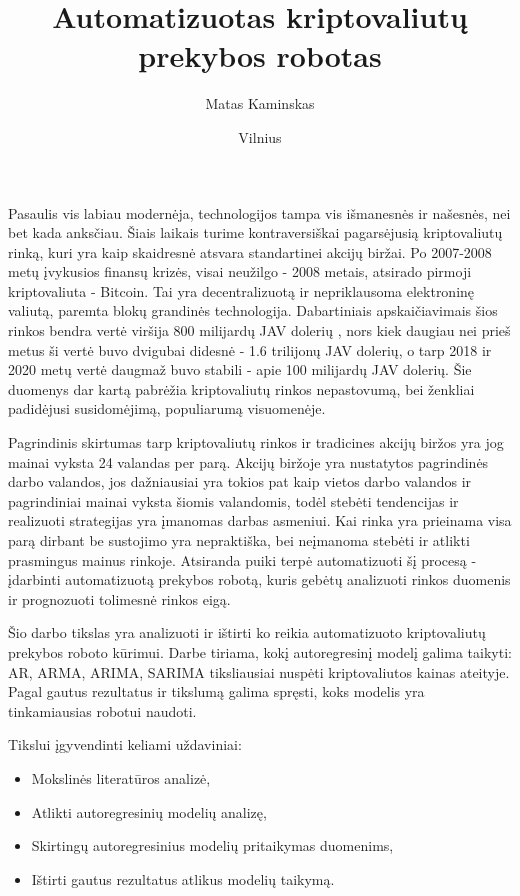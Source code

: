 \documentclass{VUMIFInfKursinis}
\institute{Informatikos institutas}  %
\title{Automatizuotas kriptovaliutų prekybos robotas}
\author{Matas Kaminskas}
\date{Vilnius \\ \the\year}
\begin{document}
\maketitle

\tableofcontents

Pasaulis vis labiau modernėja, technologijos tampa vis išmanesnės ir našesnės, nei bet kada anksčiau. Šiais laikais turime kontraversiškai pagarsėjusią
kriptovaliutų rinką, kuri yra kaip skaidresnė atsvara standartinei akcijų biržai. Po 2007-2008 metų įvykusios finansų krizės,
visai neužilgo - \cite{nakamoto2008bitcoin} 2008 metais, atsirado pirmoji kriptovaliuta - Bitcoin. Tai yra decentralizuotą ir nepriklausoma elektroninę valiutą, paremta
blokų grandinės technologija. Dabartiniais apskaičiavimais šios rinkos bendra vertė viršija 800 milijardų JAV dolerių \cite{CoinMarketCap},
nors kiek daugiau nei prieš metus ši vertė buvo dvigubai didesnė - 1.6 trilijonų JAV dolerių, o tarp 2018 ir 2020 metų vertė daugmaž buvo stabili - apie 100 milijardų JAV dolerių.
Šie duomenys dar kartą pabrėžia kriptovaliutų rinkos nepastovumą, bei ženkliai padidėjusi susidomėjimą, populiarumą visuomenėje.    


Pagrindinis skirtumas tarp kriptovaliutų rinkos ir tradicines akcijų biržos yra jog mainai vyksta 24 valandas per parą. Akcijų biržoje yra nustatytos pagrindinės darbo valandos,
jos dažniausiai yra tokios pat kaip vietos darbo valandos ir pagrindiniai mainai vyksta šiomis valandomis, todėl stebėti tendencijas ir realizuoti strategijas yra įmanomas darbas asmeniui.
Kai rinka yra prieinama visa parą dirbant be sustojimo yra nepraktiška, bei neįmanoma stebėti ir atlikti prasmingus mainus rinkoje. Atsiranda puiki terpė automatizuoti šį 
procesą - įdarbinti automatizuotą prekybos robotą, kuris gebėtų analizuoti rinkos duomenis ir prognozuoti tolimesnė rinkos eigą.


Šio darbo tikslas yra analizuoti ir ištirti ko reikia automatizuoto kriptovaliutų prekybos roboto kūrimui. 
Darbe tiriama, kokį autoregresinį modelį galima taikyti: AR, ARMA, ARIMA, SARIMA tiksliausiai nuspėti kriptovaliutos
kainas ateityje. Pagal gautus rezultatus ir tikslumą galima spręsti, koks modelis yra tinkamiausias robotui naudoti.


Tikslui įgyvendinti keliami uždaviniai:
\begin{itemize}
  \item Mokslinės literatūros analizė,
  \item Atlikti autoregresinių modelių analizę,
  \item Skirtingų autoregresinius modelių pritaikymas duomenims,
  \item Ištirti gautus rezultatus atlikus modelių taikymą.
\end{itemize}
\end{document}

